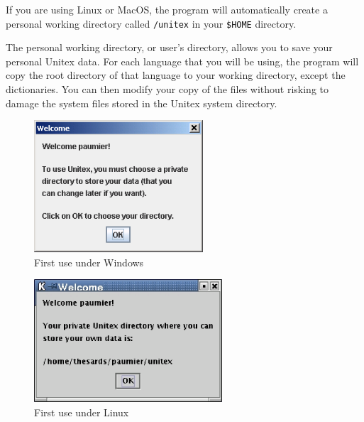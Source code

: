 \bigskip
\noindent If you are using Linux or MacOS, the program will automatically create a
personal working directory called \verb+/unitex+ in your \verb+$HOME+ directory.

\bigskip
\noindent The personal working directory, or user's directory, allows
you to save your personal Unitex data. For each language that you will be using, the
program will copy the root directory of that language to your working
directory, except the dictionaries. You can then modify your copy of the
files without risking to damage the system files stored in the
Unitex system directory.

\begin{figure}[!ht]
\begin{center}
\includegraphics[width=6.3cm]{resources/img/fig1-1.png}
\caption{First use under Windows}
\end{center}
\end{figure}

\begin{figure}[!ht]
\begin{center}
\includegraphics[width=7cm]{resources/img/fig1-2.png}
\caption{First use under Linux}
\end{center}
\end{figure}

